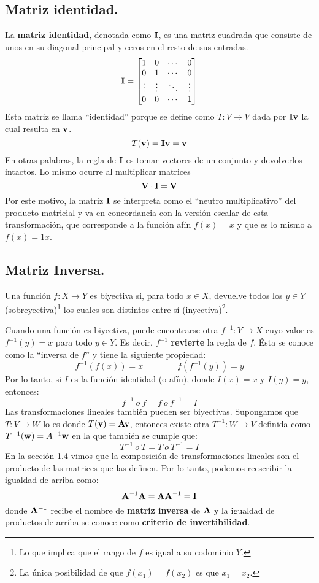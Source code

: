 \documentclass[12pt]{article}
\begin{document}
\subsection{Matriz identidad.}

La \textbf{matriz identidad}, denotada como $\mathbf{I}$, es una matriz cuadrada que consiste de unos en su diagonal principal y ceros en el resto de sus entradas.
\[
\mathbf{I} =
\begin{bmatrix}
1 & 0 & \cdots & 0 \\
0 & 1 & \cdots & 0 \\
\vdots & \vdots & \ddots & \vdots \\
0 & 0 & \cdots & 1
\end{bmatrix}
\]
Esta matriz se llama ``identidad'' porque se define como $T:V \to V$ dada por $\mathbf{I}\mathbf{v}$ la cual resulta en $\mathbf{v}$.
\[
  T(\mathbf{v}) = \mathbf{I}\mathbf{v} = \mathbf{v}
\]
En otras palabras, la regla de $\mathbf{I}$ es tomar vectores de un conjunto y devolverlos intactos. Lo mismo ocurre al multiplicar matrices
\[
  \mathbf{V} \cdot \mathbf{I} = \mathbf{V}
\]
Por este motivo, la matriz $\mathbf{I}$ se interpreta como el ``neutro multiplicativo'' del producto matricial y va en concordancia con la versión escalar de esta transformación, que corresponde a la función afín $f(x) = x$ y que es lo mismo a $f(x) = 1x$.

\subsection{Matriz Inversa.}

Una función $f:X \to Y$ es biyectiva si, para todo $x \in X$, devuelve todos los $y \in Y$ (sobreyectiva)\footnote{Lo que implica que el rango de $f$ es igual a su codominio $Y$.} los cuales son distintos entre sí (inyectiva)\footnote{La única posibilidad de que $f(x_{1}) = f(x_{2})$ es que $x_{1} = x_{2}$.}.

Cuando una función es biyectiva, puede encontrarse otra $f^{-1}:Y \to X$ cuyo valor es $f^{-1}(y) = x$ para todo $y \in Y$. Es decir, $f^{-1}$ \textbf{revierte} la regla de $f$. Ésta se conoce como la ``inversa de $f$'' y tiene la siguiente propiedad:
\[
  f^{-1}(f(x)) = x \qquad \qquad f(f^{-1}(y)) = y
\]
Por lo tanto, si $I$ es la función identidad (o afín), donde $I(x) = x$ y $I(y) = y$, entonces:
\[
  f^{-1} \ o \ f = f \ o \ f^{-1} = I
\]
Las transformaciones lineales también pueden ser biyectivas. Supongamos que $T:V \to W$ lo es donde $T(\mathbf{v}) = \mathbf{A}\mathbf{v}$, entonces existe otra $T^{-1}:W \to V$ definida como $T^{-1}(\mathbf{w}) = A^{-1}\mathbf{w}$ en la que también se cumple que:
\[
  T^{-1} \ o \ T = T \ o \ T^{-1} = I
\]
En la sección 1.4 vimos que la composición de transformaciones lineales son el producto de las matrices que las definen. Por lo tanto, podemos reescribir la igualdad de arriba como:
\[
  \mathbf{A}^{-1} \mathbf{A} = \mathbf{A} \mathbf{A}^{-1} = \mathbf{I}
\]
donde $\mathbf{A}^{-1}$ recibe el nombre de \textbf{matriz inversa} de $\mathbf{A}$ y la igualdad de productos de arriba se conoce como \textbf{criterio de invertibilidad}.
\end{document}

